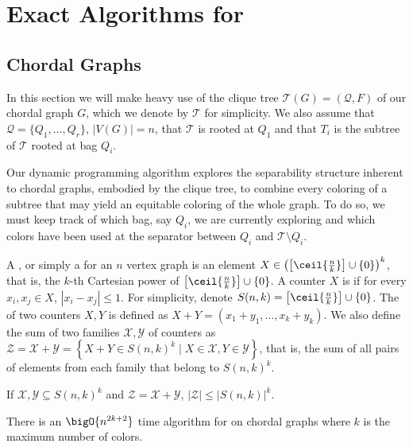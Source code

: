 \section{Exact Algorithms for }

\subsection{Chordal Graphs}

In this section we will make heavy use of the clique tree $\mathcal{T}(G) = (\mathcal{Q}, F)$ of our chordal graph $G$, which we denote by $\mathcal{T}$ for simplicity.
We also assume that $\mathcal{Q} = \{Q_1, \dots, Q_r\}$, $|V(G)| = n$, that $\mathcal{T}$ is rooted at $Q_1$ and that $T_i$ is the subtree of $\mathcal{T}$ rooted at bag $Q_i$.

Our dynamic programming algorithm explores the separability structure inherent to chordal graphs, embodied by the clique tree, to combine every coloring of a subtree that may yield an equitable coloring of the whole graph.
To do so, we must keep track of which bag, say $Q_i$, we are currently exploring and which colors have been used at the separator between $Q_i$ and $\mathcal{T} \setminus Q_i$.

A , or simply a  for an $n$ vertex graph is an element $X \in \left(\left[\ceil{\frac{n}{k}}\right] \cup \{0\}\right)^k$, that is, the $k$-th Cartesian power of $\left[\ceil{\frac{n}{k}}\right] \cup \{0\}$.
A counter $X$ is  if for every $x_i, x_j \in X$, $|x_i - x_j| \leq 1$.
For simplicity, denote $S(n,k) = \left[\ceil{\frac{n}{k}}\right] \cup \{0\}$.
The  of two counters $X,Y$ is defined as $X + Y = (x_1 + y_1, \dots, x_k + y_k)$.
We also define the sum of two families $\mathcal{X}, \mathcal{Y}$ of counters as $\mathcal{Z} = \mathcal{X} + \mathcal{Y} = \left\{X + Y \in S(n,k)^k \mid X \in \mathcal{X}, Y \in \mathcal{Y} \right\}$, that is, the sum of all pairs of elements from each family that belong to $S(n,k)^k$.

\begin{observation}
    \label{obs:counter_bound}
    If $\mathcal{X}, \mathcal{Y} \subseteq S(n,k)^k$ and $\mathcal{Z} = \mathcal{X} + \mathcal{Y}$, $|\mathcal{Z}| \leq |S(n,k)|^k $.
\end{observation}

\begin{theorem}
    \label{thm:chordal_exp}
    There is an $\bigO{n^{2k+2}}$ time algorithm for  on chordal graphs where $k$ is the maximum number of colors.
\end{theorem}

